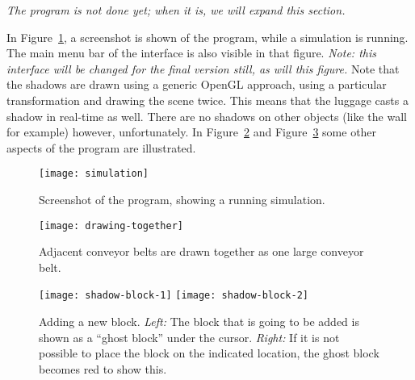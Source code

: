 \textit{The program is not done yet; when it is, we will expand this section.}

In Figure~\ref{fig:simulation}, a screenshot is shown of the program, while a simulation is running. The main menu bar of the interface is also visible in that figure. \textit{Note: this interface will be changed for the final version still, as will this figure.} Note that the shadows are drawn using a generic OpenGL approach, using a particular transformation and drawing the scene twice. This means that the luggage casts a shadow in real-time as well. There are no shadows on other objects (like the wall for example) however, unfortunately. In Figure~\ref{fig:drawing-together} and Figure~\ref{fig:shadow-block} some other aspects of the program are illustrated.

\begin{figure}
  \begin{center}
    \texttt{[image: simulation]}
    \caption{Screenshot of the program, showing a running simulation.}
    \label{fig:simulation}
  \end{center}
\end{figure}

\begin{figure}
  \begin{center}
    \texttt{[image: drawing-together]}
    \caption{Adjacent conveyor belts are drawn together as one large conveyor belt.}
    \label{fig:drawing-together}
  \end{center}
\end{figure}

\begin{figure}
  \begin{center}
    \texttt{[image: shadow-block-1]}
    \quad
    \texttt{[image: shadow-block-2]}
    \caption{Adding a new block. \textit{Left:} The block that is going to be added is shown as a ``ghost block'' under the cursor. \textit{Right:} If it is not possible to place the block on the indicated location, the ghost block becomes red to show this.}
    \label{fig:shadow-block}
  \end{center}
\end{figure}

